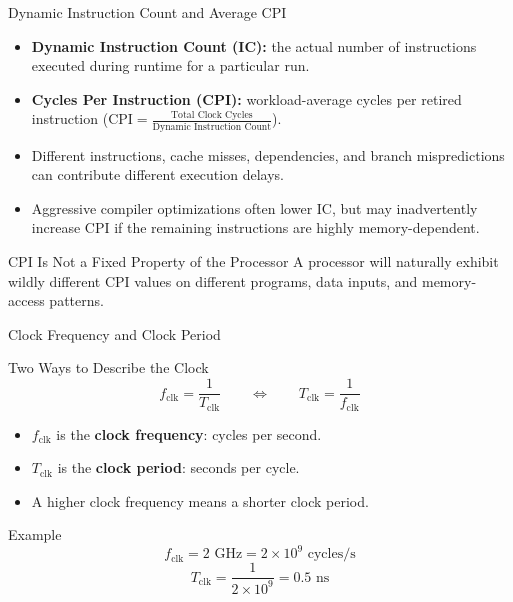 \documentclass[aspectratio=169,11pt,t]{beamer}
\newcommand{\key}[1]{\textbf{#1}}
\begin{document}
\begin{frame}{Dynamic Instruction Count and Average CPI}

\begin{itemize}\setlength{\itemsep}{5pt}
  \item \key{Dynamic Instruction Count (IC):} the actual number of instructions executed during runtime for a particular run.
  \item \key{Cycles Per Instruction (CPI):} workload-average cycles per retired instruction ($\text{CPI} = \frac{\text{Total Clock Cycles}}{\text{Dynamic Instruction Count}}$).
  \item Different instructions, cache misses, dependencies, and branch mispredictions can contribute different execution delays.
  \item Aggressive compiler optimizations often lower IC, but may inadvertently increase CPI if the remaining instructions are highly memory-dependent.
\end{itemize}

\vfill

\begin{block}{CPI Is Not a Fixed Property of the Processor}
A processor will naturally exhibit wildly different CPI values on different programs, data inputs, and memory-access patterns.
\end{block}

\end{frame}






\begin{frame}{Clock Frequency and Clock Period}

\begin{block}{Two Ways to Describe the Clock}
\[
f_{\text{clk}}=\frac{1}{T_{\text{clk}}}
\qquad\Longleftrightarrow\qquad
T_{\text{clk}}=\frac{1}{f_{\text{clk}}}
\]
\end{block}

\begin{itemize}\setlength{\itemsep}{7pt}
  \item \(f_{\text{clk}}\) is the \key{clock frequency}: cycles per second.
  \item \(T_{\text{clk}}\) is the \key{clock period}: seconds per cycle.
  \item A higher clock frequency means a shorter clock period.
\end{itemize}

\vfill

\begin{block}{Example}
\[
f_{\text{clk}} = 2\text{ GHz}
=
2\times 10^9\text{ cycles/s}
\]
\[
T_{\text{clk}}
=
\frac{1}{2\times10^9}
=
0.5\text{ ns}
\]
\end{block}

\end{frame}
\end{document}
